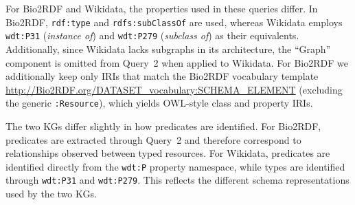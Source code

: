 \documentclass[sw]{iosart2x}
\begin{document}
For Bio2RDF and Wikidata, the properties used in these queries differ. In Bio2RDF, \texttt{rdf:type} and \texttt{rdfs:subClassOf} are used, whereas Wikidata employs \texttt{wdt:P31} (\emph{instance of}) and \texttt{wdt:P279} (\emph{subclass of}) as their equivalents. Additionally, since Wikidata lacks subgraphs in its architecture, the ``Graph'' component is omitted from Query~2 when applied to Wikidata. For Bio2RDF we additionally keep only IRIs that match the Bio2RDF vocabulary template \url{http://Bio2RDF.org/DATASET_vocabulary:SCHEMA_ELEMENT} (excluding the generic \texttt{:Resource}), which yields OWL-style class and property IRIs.

The two KGs differ slightly in how predicates are identified. For Bio2RDF, predicates are extracted through Query~2 and therefore correspond to relationships observed between typed resources. For Wikidata, predicates are identified directly from the \texttt{wdt:P} property namespace, while types are identified through \texttt{wdt:P31} and \texttt{wdt:P279}. This reflects the different schema representations used by the two KGs.
\end{document}
